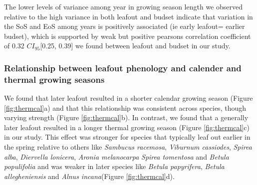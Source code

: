 \documentclass[12 pt]{article}
\begin{document}
The lower levels of variance among year in growing season length we observed relative to the high variance in both leafout and budset indicate that variation in the SoS and EoS among years is positively associated (ie early leafout= earlier budset), which is supported by weak but positive pearsons correlation coefficient of 0.32 $CI_{95}$[0.25, 0.39] we found between leafout and budset in our study.

\subsubsection{Relationship between leafout phenology and calender and thermal growing seasons}

We found that later leafout resulted in a shorter calendar growing season (Figure \ref{fig:thermcal}a) and that this relationship was consistent across species, though varying strength  (Figure \ref{fig:thermcal}b).
In contrast, we found that a generally later leafout resulted in a longer thermal growing season (Figure \ref{fig:thermcal}c) in our study. This effect was stronger for species that typically leaf out earlier in the spring relative to others like \emph{Sambucus racemosa}, \emph{Viburnum cassiodes}, \emph{Spirea alba}, \emph{Diervella lonicera}, \emph{Aronia melanocarpa} \emph{Spirea tomentosa} and \emph{Betula populifolia} and was weaker in later species like \emph{Betula papyrifera}, \emph{Betula allegheniensis} and \emph{Alnus incana}(Figure \ref{fig:thermcal}d).
\end{document}
